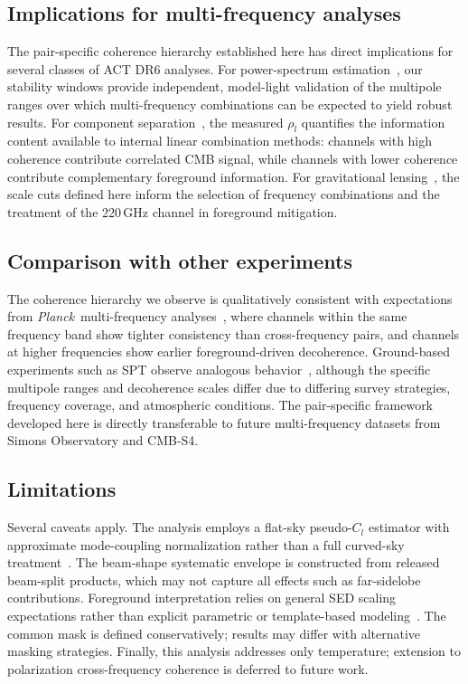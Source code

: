 \documentclass[twocolumn,showpacs,preprintnumbers,amsmath,amssymb,floatfix,prd]{revtex4-2}
\def\ell{l}%
\begin{document}
\subsection{Implications for multi-frequency analyses}\label{sec:implications}

The pair-specific coherence hierarchy established here has direct
implications for several classes of ACT DR6 analyses.  For power-spectrum
estimation~\cite{Louis2025,Calabrese2025}, our stability windows provide
independent, model-light validation of the multipole ranges over which
multi-frequency combinations can be expected to yield robust results.
For component separation~\cite{Coulton2024,Tegmark1998,Eriksen2008}, the
measured $\rho_\ell$ quantifies the information content available to
internal linear combination methods: channels with high coherence
contribute correlated CMB signal, while channels with lower coherence
contribute complementary foreground information.  For gravitational
lensing~\cite{Qu2024,Madhavacheril2024}, the scale cuts defined here
inform the selection of frequency combinations and the treatment of the
220\,GHz channel in foreground mitigation.

\subsection{Comparison with other experiments}\label{sec:comparison}

The coherence hierarchy we observe is qualitatively consistent with
expectations from \textit{Planck}\ multi-frequency
analyses~\cite{Planck2020III,Planck2020IV,Planck2020VI}, where channels
within the same frequency band show tighter consistency than cross-frequency
pairs, and channels at higher frequencies show earlier foreground-driven
decoherence.  Ground-based experiments such as SPT observe analogous
behavior~\cite{Reichardt2021,Dutcher2021}, although the specific multipole
ranges and decoherence scales differ due to differing survey strategies,
frequency coverage, and atmospheric conditions.  The pair-specific
framework developed here is directly transferable to future multi-frequency
datasets from Simons Observatory and CMB-S4.

\subsection{Limitations}\label{sec:limitations}

Several caveats apply.  The analysis employs a flat-sky pseudo-$C_\ell$
estimator with approximate mode-coupling normalization rather than a full
curved-sky treatment~\cite{Hivon2002,Alonso2019,Gorski2005}.  The
beam-shape systematic envelope is constructed from released beam-split
products, which may not capture all effects such as far-sidelobe
contributions.  Foreground interpretation relies on general SED scaling
expectations rather than explicit parametric or template-based
modeling~\cite{Planck2020IV}.  The common mask is defined conservatively;
results may differ with alternative masking strategies.  Finally, this
analysis addresses only temperature; extension to polarization
cross-frequency coherence is deferred to future work.
\end{document}
